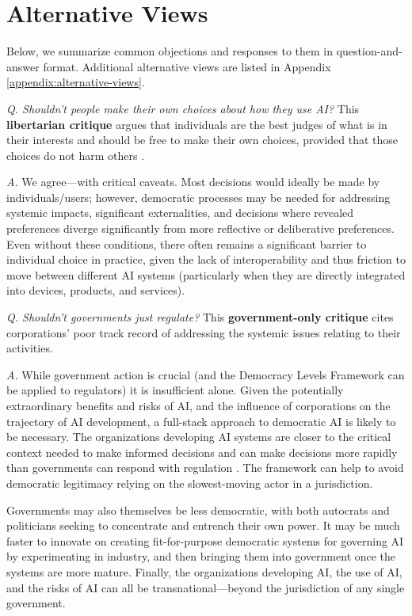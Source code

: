 \documentclass{article}
\begin{document}
\section{Alternative Views}
    
    Below, we summarize common objections and responses to them in question-and-answer format. Additional alternative views are listed in Appendix \ref{appendix:alternative-views}.

    \textit{Q. Shouldn't people make their own choices about how they use AI?} This \textbf{libertarian critique} argues that individuals are the best judges of what is in their interests and should be free to make their own choices, provided that those choices do not harm others \cite{locke1887,mill1966}.
    
    \textit{A.} We agree---with critical caveats. 
    Most decisions would ideally be made by individuals/users; however, democratic processes may be needed for addressing systemic impacts, significant externalities, and decisions where revealed preferences diverge significantly from more reflective or deliberative preferences. 
    Even without these conditions, there often remains a significant barrier to individual choice in practice, given the lack of interoperability and thus friction to move between different AI systems (particularly when they are directly integrated into devices, products, and services). 

    \textit{Q. Shouldn't governments just regulate?} This \textbf{government-only critique} cites corporations' poor track record of addressing the systemic issues relating to their activities.    
    
    \textit{A.} While government action is crucial (and the Democracy Levels Framework can be applied to regulators) it is insufficient alone. Given the potentially extraordinary benefits and risks of AI, and the influence of corporations on the trajectory of AI development, a full-stack approach to democratic AI is likely to be necessary. The organizations developing AI systems are closer to the critical context needed to make informed decisions and can make decisions more rapidly than governments can respond with regulation \cite{Brookings2023}. The framework can help to avoid democratic legitimacy relying on the slowest-moving actor in a jurisdiction. 
    
    Governments may also themselves be less democratic, with both autocrats and politicians seeking to concentrate and entrench their own power. It may be much faster to innovate on creating fit-for-purpose democratic systems for governing AI by experimenting in industry, and then bringing them into government once the systems are more mature. Finally, the organizations developing AI, the use of AI, and the risks of AI can all be transnational---beyond the jurisdiction of any single government. 
\end{document}
